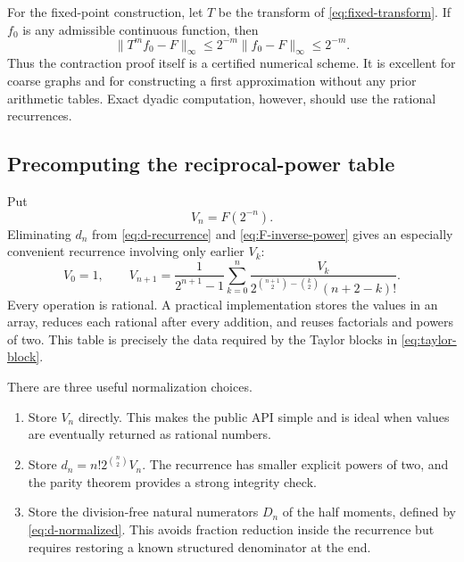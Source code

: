 \documentclass[11pt,oneside]{article}
\theoremstyle{definition}
\theoremstyle{remark}
\begin{document}
For the fixed-point construction, let $T$ be the transform of
\eqref{eq:fixed-transform}.  If $f_0$ is any admissible continuous function, then
\begin{equation}
 \|T^m f_0-F\|_\infty
 \le 2^{-m}\|f_0-F\|_\infty
 \le 2^{-m}.                                               \label{eq:fixed-point-error}
\end{equation}
Thus the contraction proof itself is a certified numerical scheme.  It is excellent for
coarse graphs and for constructing a first approximation without any prior arithmetic
tables.  Exact dyadic computation, however, should use the rational recurrences.

\subsection{Precomputing the reciprocal-power table}

Put
\begin{equation}
 V_n=F(2^{-n}).
\end{equation}
Eliminating $d_n$ from \eqref{eq:d-recurrence} and
\eqref{eq:F-inverse-power} gives an especially convenient recurrence involving only earlier
$V_k$:
\begin{equation}
 V_0=1,\qquad
 V_{n+1}
 =
 \frac{1}{2^{n+1}-1}
 \sum_{k=0}^{n}
 \frac{V_k}
 {2^{\binom{n+1}{2}-\binom{k}{2}}(n+2-k)!}.               \label{eq:V-table-recurrence}
\end{equation}
Every operation is rational.  A practical implementation stores the values in an array,
reduces each rational after every addition, and reuses factorials and powers of two.  This
table is precisely the data required by the Taylor blocks in
\eqref{eq:taylor-block}.

There are three useful normalization choices.

\begin{enumerate}
\item Store $V_n$ directly.  This makes the public API simple and is ideal when values are
      eventually returned as rational numbers.
\item Store $d_n=n!2^{\binom n2}V_n$.  The recurrence has smaller explicit powers of two,
      and the parity theorem provides a strong integrity check.
\item Store the division-free natural numerators $D_n$ of the half moments, defined by
      \eqref{eq:d-normalized}.  This avoids
      fraction reduction inside the recurrence but requires restoring a known structured
      denominator at the end.
\end{enumerate}
\end{document}
